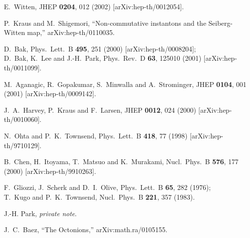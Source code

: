 \documentclass[a4paper,11pt]{article}
\begin{document}
\begin{thebibliography}{99}
E.~Witten,
JHEP {\bf 0204}, 012 (2002)
[arXiv:hep-th/0012054].

P.~Kraus and M.~Shigemori,
``Non-commutative instantons and the Seiberg-Witten map,''
arXiv:hep-th/0110035.


D.~Bak,
Phys.\ Lett.\ B {\bf 495}, 251 (2000) [arXiv:hep-th/0008204];\\
D.~Bak, K.~Lee and J.-H.~Park,
Phys.\ Rev.\ D {\bf 63}, 125010 (2001)
[arXiv:hep-th/0011099].

M.~Aganagic, R.~Gopakumar, S.~Minwalla and A.~Strominger,
JHEP {\bf 0104}, 001 (2001)
[arXiv:hep-th/0009142].


J.~A.~Harvey, P.~Kraus and F.~Larsen,
JHEP {\bf 0012}, 024 (2000)
[arXiv:hep-th/0010060].




N.~Ohta and P.~K.~Townsend,
Phys.\ Lett.\ B {\bf 418}, 77 (1998) [arXiv:hep-th/9710129].



B.~Chen, H.~Itoyama, T.~Matsuo and K.~Murakami,
Nucl.\ Phys.\ B {\bf 576}, 177 (2000) [arXiv:hep-th/9910263].




F.~Gliozzi, J.~Scherk and D.~I.~Olive,
Phys.\ Lett.\ B {\bf 65}, 282 (1976);\\
T.~Kugo and P.~K.~Townsend,
Nucl.\ Phys.\ B {\bf 221}, 357 (1983).




J.-H. Park, {\it private note}.



J.~C.~Baez, ``The Octonions,'' arXiv:math.ra/0105155.



\end{thebibliography}
\end{document}

